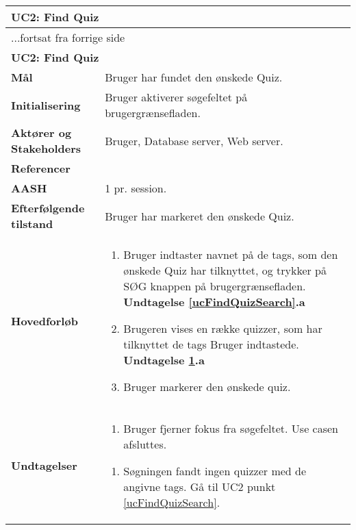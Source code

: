 \begin{center} \centering \label{ucFindQuiz}
	\begin{longtable}{|p{4.6cm}|p{9.4cm}|}  %
	\hline
		\multicolumn{2}{|l|}{\textbf{UC2: Find Quiz}} \\\hline
		\endfirsthead
		
		\multicolumn{2}{l}{...fortsat fra forrige side} \\ \hline %
		\multicolumn{2}{|l|}{\textbf{UC2: Find Quiz}} \\\hline
		\endhead	
		
		\textbf{Mål}					& Bruger har fundet den ønskede Quiz.
		\\\hline
		\textbf{Initialisering}			& Bruger aktiverer søgefeltet på brugergrænsefladen.
		\\\hline
		\textbf{Aktører og Stakeholders}	& Bruger, Database server, Web server.
		\\\hline 
		\textbf{Referencer}				& %
		\\\hline
		\textbf{AASH}					& 1 pr. session.
		\\\hline
		\textbf{Efterfølgende tilstand}	& Bruger har markeret den ønskede Quiz.
		\\\hline
		\textbf{Hovedforløb}					
			&\begin{enumerate}
				\item \label{ucFindQuizSearch} Bruger indtaster navnet på de tags, som den ønskede Quiz har tilknyttet, og trykker på SØG knappen på brugergrænsefladen. 
				\textbf{Undtagelse \ref{ucFindQuizSearch}.a}
				\item \label{ucFindQuizNoResults} Brugeren vises en række quizzer, som har tilknyttet de tags Bruger indtastede.
				\textbf{Undtagelse \ref{ucFindQuizNoResults}.a}
				\item Bruger markerer den ønskede quiz.
				
			\end{enumerate}\\\hline
		\textbf{Undtagelser}
			&\begin{enumerate} [label=\ref{ucFindQuizSearch}.a]
				\item Bruger fjerner fokus fra søgefeltet.
				\subitem Use casen afsluttes.
			\end{enumerate}
			\begin{enumerate} [label=\ref{ucFindQuizNoResults}.a]
				\item Søgningen fandt ingen quizzer med de angivne tags.
				\subitem Gå til UC2 punkt \ref{ucFindQuizSearch}.
			\end{enumerate}
						
			\\\hline
	\end{longtable} 
\end{center}